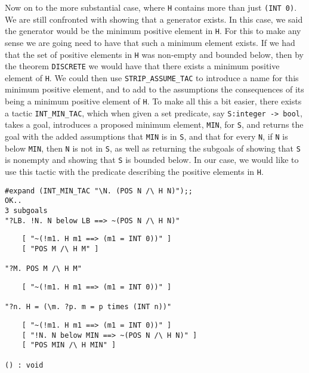Now on to the more substantial case, where {\small\tt H} contains more
than just {\small\verb+(INT 0)+}.  We are still confronted with showing
that a generator exists.  In this case, we said the generator would be
the minimum positive element in {\small\tt H}.  For this to make any
sense we are going need to have that such a minimum element exists.  If
we had that the set of positive elements in {\small\tt H} was non-empty
and bounded below, then by the theorem {\small\verb+DISCRETE+} we would
have that there exists a minimum positive element of {\small\tt H}.  We
could then use {\small\verb+STRIP_ASSUME_TAC+} to introduce a name for
this minimum positive element, and to add to the assumptions the
consequences of its being a minimum positive element of {\small\tt H}.
To make all this a bit easier, there exists a tactic
{\small\verb+INT_MIN_TAC+}, which when given a set predicate, say
{\small\verb+S:integer -> bool+}, takes a goal, introduces a proposed
minimum element, {\small\verb+MIN+}, for {\small\tt S}, and returns
the goal with the added assumptions that {\small\verb+MIN+} is in
{\small\tt S}, and that for every {\small\tt N}, if {\small\tt N} is
below {\small\verb+MIN+}, then {\small\tt N} is not in {\small\tt S},
as well as returning the subgoals of showing that {\small\tt S} is
nonempty and showing that {\small\tt S} is bounded below.  In our
case, we would like to use this tactic with the predicate describing
the positive elements in {\small\tt H}.

\newpage %

\begin{session}
\begin{verbatim}
#expand (INT_MIN_TAC "\N. (POS N /\ H N)");;
OK..
3 subgoals
"?LB. !N. N below LB ==> ~(POS N /\ H N)"
 \end{verbatim}
\mvdots
\begin{verbatim}
    [ "~(!m1. H m1 ==> (m1 = INT 0))" ]
    [ "POS M /\ H M" ]

"?M. POS M /\ H M"
\end{verbatim}
\mvdots
\begin{verbatim}
    [ "~(!m1. H m1 ==> (m1 = INT 0))" ]

"?n. H = (\m. ?p. m = p times (INT n))"
\end{verbatim}
\mvdots
\begin{verbatim}
    [ "~(!m1. H m1 ==> (m1 = INT 0))" ]
    [ "!N. N below MIN ==> ~(POS N /\ H N)" ]
    [ "POS MIN /\ H MIN" ]

() : void
\end{verbatim}
\end{session}

